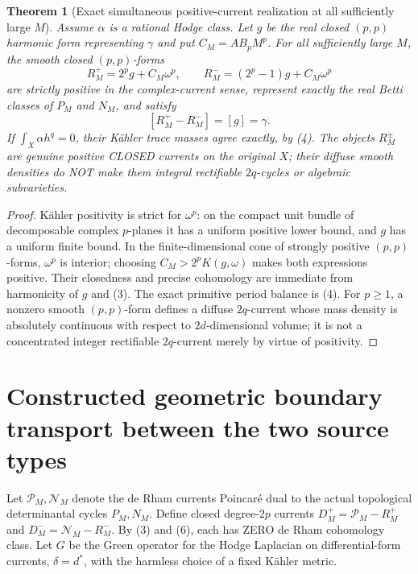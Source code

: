 \documentclass[11pt]{article}
\newtheorem{theorem}{Theorem}[section]
\begin{document}
\begin{theorem}[Exact simultaneous positive-current realization at all sufficiently large \(M\)]
Assume \(\alpha\) is a rational Hodge class. Let \(g\) be the real closed \((p,p)\) harmonic form representing \(\gamma\) and put \(C_M=A B_pM^p\). For all sufficiently large \(M\), the smooth closed \((p,p)\)-forms
\[
\boxed{R_M^+=2^p g+C_M\omega^p,\qquad
R_M^-=(2^p-1)g+C_M\omega^p}                                \tag{6}
\]
are strictly positive in the complex-current sense, represent exactly the real Betti classes of \(P_M\) and \(N_M\), and satisfy
\[
[R_M^+-R_M^-]=[g]=\gamma.                                    \tag{7}
\]
If \(\int_X\alpha h^q=0\), their K\"ahler trace masses agree exactly, by (4). The objects \(R_M^\pm\) are genuine positive CLOSED currents on the original \(X\); their diffuse smooth densities do NOT make them integral rectifiable \(2q\)-cycles or algebraic subvarieties.
\end{theorem}
\begin{proof}
K\"ahler positivity is strict for \(\omega^p\): on the compact unit bundle of decomposable complex \(p\)-planes it has a uniform positive lower bound, and \(g\) has a uniform finite bound. In the finite-dimensional cone of strongly positive \((p,p)\)-forms, \(\omega^p\) is interior; choosing \(C_M>2^p K(g,\omega)\) makes both expressions positive. Their closedness and precise cohomology are immediate from harmonicity of \(g\) and (3). The exact primitive period balance is (4). For \(p\ge1\), a nonzero smooth \((p,p)\)-form defines a diffuse \(2q\)-current whose mass density is absolutely continuous with respect to \(2d\)-dimensional volume; it is not a concentrated integer rectifiable \(2q\)-current merely by virtue of positivity.
\end{proof}

\section{Constructed geometric boundary transport between the two source types}
Let \(\mathcal P_M,\mathcal N_M\) denote the de Rham currents Poincar\'e dual to the actual topological determinantal cycles \(P_M,N_M\). Define closed degree-\(2p\) currents
\(D_M^+=\mathcal P_M-R_M^+\) and
\(D_M^-=\mathcal N_M-R_M^-\).
By (3) and (6), each has ZERO de Rham cohomology class. Let \(G\) be the Green operator for the Hodge Laplacian on differential-form currents, \(\delta=d^*\), with the harmless choice of a fixed K\"ahler metric.
\end{document}

